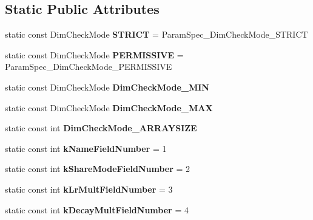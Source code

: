 \subsection*{Static Public Attributes}
\begin{DoxyCompactItemize}
\item 
\mbox{\label{classcaffe_1_1_param_spec_a5d73c69aa07b8ca354d6c00ad73c308b}} 
static const Dim\+Check\+Mode {\bfseries S\+T\+R\+I\+CT} = Param\+Spec\+\_\+\+Dim\+Check\+Mode\+\_\+\+S\+T\+R\+I\+CT
\item 
\mbox{\label{classcaffe_1_1_param_spec_aa9de68460b53d4a13d8f23fb65011230}} 
static const Dim\+Check\+Mode {\bfseries P\+E\+R\+M\+I\+S\+S\+I\+VE} = Param\+Spec\+\_\+\+Dim\+Check\+Mode\+\_\+\+P\+E\+R\+M\+I\+S\+S\+I\+VE
\item 
static const Dim\+Check\+Mode {\bfseries Dim\+Check\+Mode\+\_\+\+M\+IN}
\item 
static const Dim\+Check\+Mode {\bfseries Dim\+Check\+Mode\+\_\+\+M\+AX}
\item 
static const int {\bfseries Dim\+Check\+Mode\+\_\+\+A\+R\+R\+A\+Y\+S\+I\+ZE}
\item 
\mbox{\label{classcaffe_1_1_param_spec_a3a631d704f65505d049d963b42f435f0}} 
static const int {\bfseries k\+Name\+Field\+Number} = 1
\item 
\mbox{\label{classcaffe_1_1_param_spec_a4dfc1f42ac3ad458fe836a97a0dcbbbb}} 
static const int {\bfseries k\+Share\+Mode\+Field\+Number} = 2
\item 
\mbox{\label{classcaffe_1_1_param_spec_a92a99604f483fe6904ddb82df005aebd}} 
static const int {\bfseries k\+Lr\+Mult\+Field\+Number} = 3
\item 
\mbox{\label{classcaffe_1_1_param_spec_acc31af2ad3b128e5c8a0b160156ca802}} 
static const int {\bfseries k\+Decay\+Mult\+Field\+Number} = 4
\end{DoxyCompactItemize}
